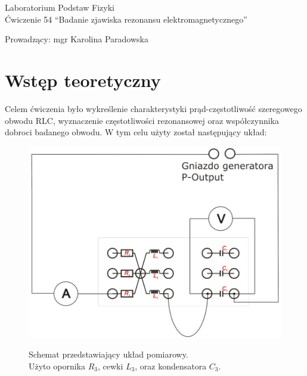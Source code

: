 \documentclass[polish, 11pt, a4paper]{article}
\begin{document}
	\begin{titlepage}
		\centering
		\Huge Laboratorium Podstaw Fizyki\\
		\vspace{1cm}
		\huge Ćwiczenie 54 \enquote{Badanie zjawiska rezonansu elektromagnetycznego}\\
		\vspace{1cm}
		\raggedright
		\huge Prowadzący: mgr Karolina Paradowska\\
		\vspace{.5cm}
		\begin{table}[h]
			\centering
		\end{table}
	\end{titlepage}

	\section{Wstęp teoretyczny}
		\RaggedRight
		Celem ćwiczenia było wykreślenie charakterystyki prąd-częstotliwość szeregowego obwodu RLC, wyznaczenie częstotliwości rezonansowej oraz współczynnika dobroci badanego obwodu.
		W tym celu użyty został następujący układ:
		\begin{figure}[H]
			\centering
			\includegraphics[width=.5\textwidth]{Fizyka54Rysunek1}

			Schemat przedstawiający układ pomiarowy.\\
			Użyto opornika \(R_3\), cewki \(L_3\), oraz kondensatora \(C_3\).
		\end{figure}
\end{document}
